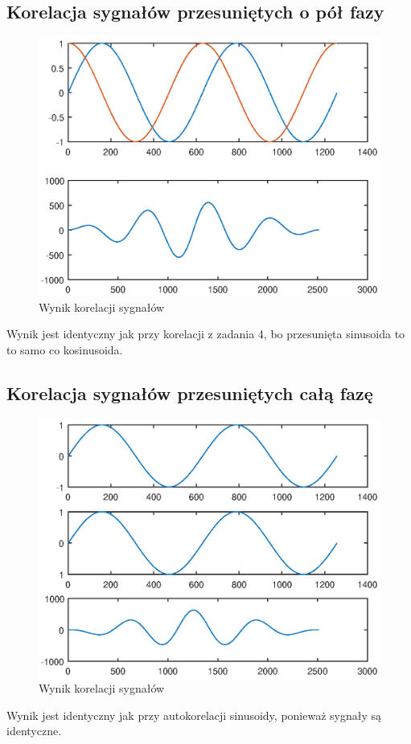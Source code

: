 \documentclass[12pt,titlepage]{report}
\begin{document}
\subsection{Korelacja sygnałów przesuniętych o pół fazy}

\begin{figure}[!h]
	\centering
	\includegraphics[scale=0.7]{../cw54_output}
	\caption{Wynik korelacji sygnałów}
\end{figure}
Wynik jest identyczny jak przy korelacji z zadania 4, bo przesunięta sinusoida to to samo co kosinusoida.

\subsection{Korelacja sygnałów przesuniętych całą fazę}

\begin{figure}[!h]
	\centering
	\includegraphics[scale=0.7]{../cw56_output}
	\caption{Wynik korelacji sygnałów}
\end{figure}
Wynik jest identyczny jak przy autokorelacji sinusoidy, ponieważ sygnały są identyczne.
\newpage
\end{document}
